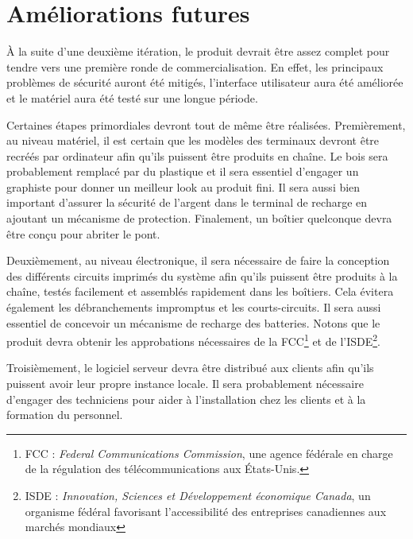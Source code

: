 \section{Améliorations futures}
À la suite d’une deuxième itération, le produit devrait être assez complet pour tendre vers une première ronde de commercialisation. En effet, les principaux problèmes de sécurité auront été mitigés, l’interface utilisateur aura été améliorée et le matériel aura été testé sur une longue période.

Certaines étapes primordiales devront tout de même être réalisées. Premièrement, au niveau matériel, il est certain que les modèles des terminaux devront être recréés par ordinateur afin qu’ils puissent être produits en chaîne. Le bois sera probablement remplacé par du plastique et il sera essentiel d’engager un graphiste pour donner un meilleur \og look \fg{} au produit fini. Il sera aussi bien important d’assurer la sécurité de l’argent dans le terminal de recharge en ajoutant un mécanisme de protection. Finalement, un boîtier quelconque devra être conçu pour abriter le pont. 

Deuxièmement, au niveau électronique, il sera nécessaire de faire la conception des différents circuits imprimés du système afin qu’ils puissent être produits à la chaîne, testés facilement et assemblés rapidement dans les boîtiers. Cela évitera également les débranchements impromptus et les courts-circuits. Il sera aussi essentiel de concevoir un mécanisme de recharge des batteries. Notons que le produit devra obtenir les approbations nécessaires de la FCC\footnote{FCC : \emph{Federal Communications Commission}, une agence fédérale en charge de la régulation des télécommunications aux États-Unis.} et de l'ISDE\footnote{ISDE : \emph{Innovation, Sciences et Développement économique Canada}, un organisme fédéral favorisant l'accessibilité des entreprises canadiennes aux marchés mondiaux}.

Troisièmement, le logiciel serveur devra être distribué aux clients afin qu’ils puissent avoir leur propre instance locale. Il sera probablement nécessaire d’engager des techniciens pour aider à l’installation chez les clients et à la formation du personnel. 
